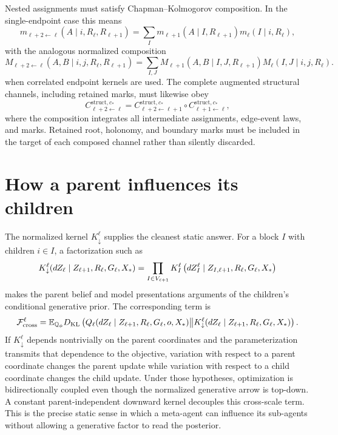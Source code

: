 Nested assignments must satisfy Chapman--Kolmogorov composition. In the
single-endpoint case this means
\begin{equation}
m_{\ell+2\leftarrow\ell}(A\mid i,R_\ell,R_{\ell+1})
=\sum_I m_{\ell+1}(A\mid I,R_{\ell+1})
m_\ell(I\mid i,R_\ell),
\label{eq:full-graph-membership-composition}
\end{equation}
with the analogous normalized composition
\begin{equation}
M_{\ell+2\leftarrow\ell}(A,B\mid i,j,R_\ell,R_{\ell+1})
=\sum_{I,J}M_{\ell+1}(A,B\mid I,J,R_{\ell+1})
M_\ell(I,J\mid i,j,R_\ell).
\label{eq:full-graph-joint-membership-composition}
\end{equation}
when correlated endpoint kernels are used. The complete augmented structural
channels, including retained marks, must likewise obey
\begin{equation}
C^{\mathrm{struct},c_*}_{\ell+2\leftarrow\ell}
=C^{\mathrm{struct},c_*}_{\ell+2\leftarrow\ell+1}
\circ C^{\mathrm{struct},c_*}_{\ell+1\leftarrow\ell},
\label{eq:full-graph-structural-channel-composition}
\end{equation}
where the composition integrates all intermediate assignments, edge-event
laws, and marks. Retained root, holonomy, and boundary marks must be included
in the target of each composed channel rather than silently discarded.

\section{How a parent influences its children}
\label{sec:full-graph-vfe-downward}

The normalized kernel $K_\downarrow^\ell$ supplies the cleanest static answer.
For a block $I$ with children $i\in I$, a factorization such as
\begin{equation}
K_\downarrow^\ell(dZ_\ell\mid Z_{\ell+1},R_\ell,G_\ell,X_*)
=\prod_{I\in V_{\ell+1}}K_I^\ell
\left(dZ_I^\ell\mid Z_{I,\ell+1},R_\ell,G_\ell,X_*\right)
\label{eq:full-graph-downward-kernel}
\end{equation}
makes the parent belief and model presentations arguments of the children's
conditional generative prior. The corresponding term is
\begin{equation}
\mathcal F_{\mathrm{cross}}^\ell
=\mathbb E_{\mathbb Q_\phi}
D_{\mathrm{KL}}\left(
Q_\ell(dZ_\ell\mid Z_{\ell+1},R_\ell,G_\ell,o,X_*)
\middle\Vert
K_\downarrow^\ell(dZ_\ell\mid Z_{\ell+1},R_\ell,G_\ell,X_*)
\right).
\label{eq:full-graph-cross-scale-kl}
\end{equation}
If $K_\downarrow^\ell$ depends nontrivially on the parent coordinates and the
parameterization transmits that dependence to the objective, variation with
respect to a parent coordinate changes the parent update while variation with
respect to a child coordinate changes the child update. Under those
hypotheses, optimization is bidirectionally coupled even though the normalized
generative arrow is top-down. A constant parent-independent downward kernel
decouples this cross-scale term. This is the precise static sense in which a
meta-agent can influence its sub-agents without allowing a generative factor
to read the posterior. 

